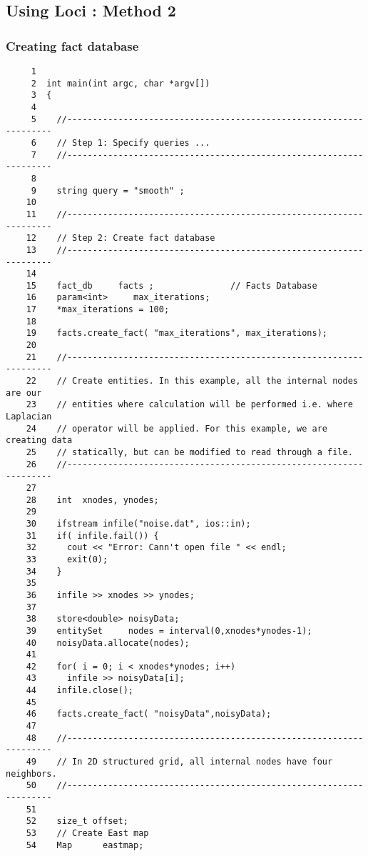 \subsection{ Using Loci : Method 2}

\subsubsection { Creating fact database }
\begin{verbatim}
     1
     2  int main(int argc, char *argv[])
     3  {
     4
     5    //-------------------------------------------------------------------
     6    // Step 1: Specify queries ...
     7    //-------------------------------------------------------------------
     8
     9    string query = "smooth" ;
    10
    11    //-------------------------------------------------------------------
    12    // Step 2: Create fact database
    13    //-------------------------------------------------------------------
    14
    15    fact_db     facts ;               // Facts Database
    16    param<int>     max_iterations;
    17    *max_iterations = 100;
    18
    19    facts.create_fact( "max_iterations", max_iterations);
    20
    21    //-------------------------------------------------------------------
    22    // Create entities. In this example, all the internal nodes are our
    23    // entities where calculation will be performed i.e. where Laplacian
    24    // operator will be applied. For this example, we are creating data
    25    // statically, but can be modified to read through a file.
    26    //-------------------------------------------------------------------
    27
    28    int  xnodes, ynodes;
    29
    30    ifstream infile("noise.dat", ios::in);
    31    if( infile.fail()) {
    32      cout << "Error: Cann't open file " << endl;
    33      exit(0);
    34    }
    35
    36    infile >> xnodes >> ynodes;
    37
    38    store<double> noisyData;
    39    entitySet     nodes = interval(0,xnodes*ynodes-1);
    40    noisyData.allocate(nodes);
    41
    42    for( i = 0; i < xnodes*ynodes; i++)
    43      infile >> noisyData[i];
    44    infile.close();
    45
    46    facts.create_fact( "noisyData",noisyData);
    47
    48    //-------------------------------------------------------------------
    49    // In 2D structured grid, all internal nodes have four neighbors.
    50    //-------------------------------------------------------------------
    51
    52    size_t offset;
    53    // Create East map
    54    Map      eastmap;

\end{verbatim}

